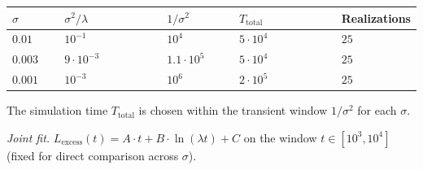 \documentclass[pdflatex,sn-mathphys-ay]{sn-jnl}
\begin{document}
\begin{center}\small
\begin{tabular}{@{} >{\raggedright\arraybackslash}p{0.1316\linewidth} >{\raggedright\arraybackslash}p{0.2632\linewidth} >{\raggedright\arraybackslash}p{0.1842\linewidth} >{\raggedright\arraybackslash}p{0.2632\linewidth} >{\raggedright\arraybackslash}p{0.1579\linewidth}@{}}
\toprule

\begin{minipage}[b]{\linewidth}\raggedright

\(\sigma\)

\end{minipage} & \begin{minipage}[b]{\linewidth}\raggedright

\(\sigma^2/\lambda\)

\end{minipage} & \begin{minipage}[b]{\linewidth}\raggedright

\(1/\sigma^2\)

\end{minipage} & \begin{minipage}[b]{\linewidth}\raggedright

\(T_{\text{total}}\)

\end{minipage} & \begin{minipage}[b]{\linewidth}\raggedright

Realizations

\end{minipage} \\

\midrule

\(0.01\) & \(10^{-1}\) & \(10^4\) & \(5 \cdot 10^4\) & \(25\) \\

\(0.003\) & \(9 \cdot 10^{-3}\) & \(1.1 \cdot 10^5\) & \(5 \cdot 10^4\) & \(25\) \\

\(0.001\) & \(10^{-3}\) & \(10^6\) & \(2 \cdot 10^5\) & \(25\) \\

\bottomrule
\end{tabular}
\end{center}


The simulation time \(T_{\text{total}}\) is chosen within the transient window \(1/\sigma^2\) for each \(\sigma\).



\emph{Joint fit.} \(L_{\text{excess}}(t) = A \cdot t + B \cdot \ln(\lambda t) + C\) on the window \(t \in [10^3, 10^4]\) (fixed for direct comparison across \(\sigma\)).
\end{document}

